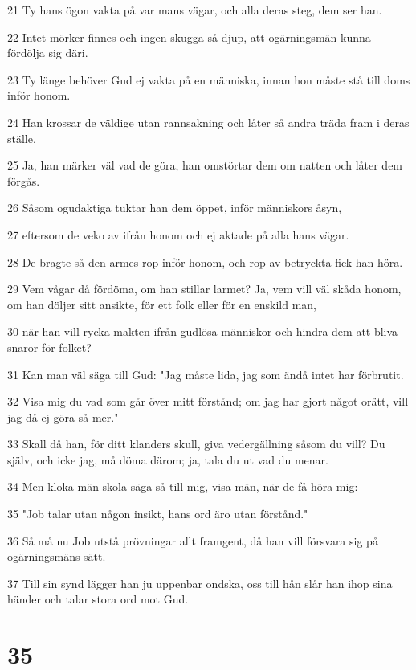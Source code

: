\par 21 Ty hans ögon vakta på var mans vägar, och alla deras steg, dem ser han.
\par 22 Intet mörker finnes och ingen skugga så djup, att ogärningsmän kunna fördölja sig däri.
\par 23 Ty länge behöver Gud ej vakta på en människa, innan hon måste stå till doms inför honom.
\par 24 Han krossar de väldige utan rannsakning och låter så andra träda fram i deras ställe.
\par 25 Ja, han märker väl vad de göra, han omstörtar dem om natten och låter dem förgås.
\par 26 Såsom ogudaktiga tuktar han dem öppet, inför människors åsyn,
\par 27 eftersom de veko av ifrån honom och ej aktade på alla hans vägar.
\par 28 De bragte så den armes rop inför honom, och rop av betryckta fick han höra.
\par 29 Vem vågar då fördöma, om han stillar larmet? Ja, vem vill väl skåda honom, om han döljer sitt ansikte, för ett folk eller för en enskild man,
\par 30 när han vill rycka makten ifrån gudlösa människor och hindra dem att bliva snaror för folket?
\par 31 Kan man väl säga till Gud: "Jag måste lida, jag som ändå intet har förbrutit.
\par 32 Visa mig du vad som går över mitt förstånd; om jag har gjort något orätt, vill jag då ej göra så mer."
\par 33 Skall då han, för ditt klanders skull, giva vedergällning såsom du vill? Du själv, och icke jag, må döma därom; ja, tala du ut vad du menar.
\par 34 Men kloka män skola säga så till mig, visa män, när de få höra mig:
\par 35 "Job talar utan någon insikt, hans ord äro utan förstånd."
\par 36 Så må nu Job utstå prövningar allt framgent, då han vill försvara sig på ogärningsmäns sätt.
\par 37 Till sin synd lägger han ju uppenbar ondska, oss till hån slår han ihop sina händer och talar stora ord mot Gud.

\chapter{35}

